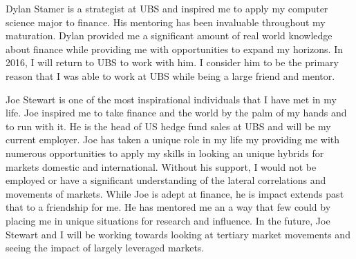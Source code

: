 \documentclass[paper=letter, fontsize=11pt]{scrartcl}
\numberwithin{equation}{section}		%
\numberwithin{figure}{section}			%
\numberwithin{table}{section}				%
\begin{document}
\begin{spacing}{2}
Dylan Stamer is a strategist at UBS and inspired me to apply my computer science major to finance. His mentoring has been invaluable throughout my maturation. Dylan provided me a significant amount of real world knowledge  about finance while providing me with opportunities to expand my horizons. In 2016, I will return to UBS to work with him. I consider him to be the primary reason that I was able to work at UBS while being a large friend and mentor. 

Joe Stewart is one of the most inspirational individuals that I have met in my life. Joe inspired me to take finance and the world by the palm of my hands and to run with it. He is the head of US hedge fund sales at UBS and will be my current employer. Joe has taken a unique role in my life my providing me with numerous opportunities to apply my skills in looking an unique hybrids for markets domestic and international. Without his support, I would not be employed or have a significant understanding of the lateral correlations and movements of markets. While Joe is adept at finance, he is impact extends past that to a friendship for me. He has mentored me an a way that few could by placing me in unique situations for research and influence. In the future, Joe Stewart and I will be working towards looking at tertiary market movements and seeing the impact of largely leveraged markets. 


\end{spacing}
\end{document}
